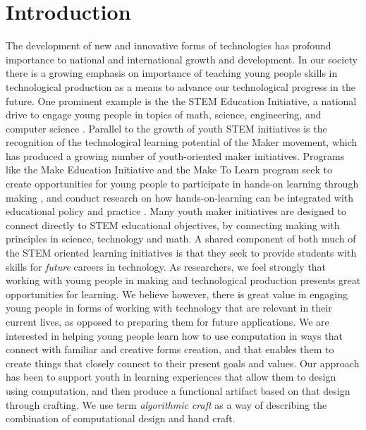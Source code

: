 \documentclass{sigchi}
\begin{document}


\section{Introduction}
The development of new and innovative forms of technologies has profound importance to national and international growth and development. In our society there is a growing emphasis on importance of teaching young people skills in technological production as a means to advance our technological progress in the future. One prominent example is the the STEM Education Initiative, a national drive to engage young people in topics of math, science, engineering, and computer science \cite{stemReport}. Parallel to the growth of youth STEM initiatives is the recognition of the technological learning potential of the Maker movement, which has produced a growing number of youth-oriented maker initiatives. Programs like the Make Education Initiative and the Make To Learn program seek to create opportunities for young people to participate in hands-on learning through making \cite{makerinitiatives}, and conduct research on how hands-on-learning can be integrated with educational policy and practice \cite{maketolearn}. Many youth maker initiatives are designed to connect directly to STEM educational objectives, by connecting making with principles in science, technology and math. A shared component of both much of the STEM oriented learning initiatives is that they seek to provide students with skills for \textit{future} careers in technology. %
As researchers, we feel strongly that working with young people in making and technological production presents great opportunities for learning. We believe however, there is great value in engaging young people in forms of working with technology that are relevant in their current lives, as opposed to preparing them for future applications. We are interested in helping young people learn how to use computation in ways that connect with familiar and creative forms creation, and that enables them to create things that closely connect to their present goals and values. Our approach has been to support youth in learning experiences that allow them to design using computation, and then produce a functional artifact based on that design through crafting. We use term \textit{algorithmic craft} as a way of describing the combination of computational design and hand craft. 
\end{document}

